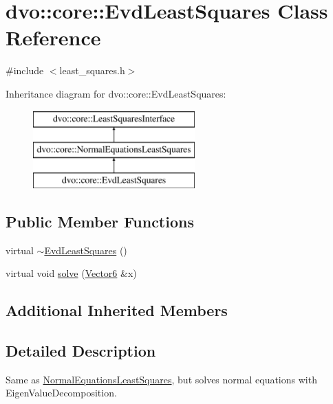 \hypertarget{classdvo_1_1core_1_1_evd_least_squares}{}\section{dvo\+:\+:core\+:\+:Evd\+Least\+Squares Class Reference}
\label{classdvo_1_1core_1_1_evd_least_squares}


{\ttfamily \#include $<$least\+\_\+squares.\+h$>$}

Inheritance diagram for dvo\+:\+:core\+:\+:Evd\+Least\+Squares\+:\begin{figure}[H]
\begin{center}
\leavevmode
\includegraphics[height=3.000000cm]{classdvo_1_1core_1_1_evd_least_squares}
\end{center}
\end{figure}
\subsection*{Public Member Functions}
\begin{DoxyCompactItemize}
\item 
virtual \mbox{\hyperlink{classdvo_1_1core_1_1_evd_least_squares_a560024b449e22ea0da7565b5d798b154}{$\sim$\+Evd\+Least\+Squares}} ()
\item 
virtual void \mbox{\hyperlink{classdvo_1_1core_1_1_evd_least_squares_a7264139b3006d803039707c4318d2451}{solve}} (\mbox{\hyperlink{namespacedvo_1_1core_a05327f3312d32a301bce9fccda9e5807}{Vector6}} \&x)
\end{DoxyCompactItemize}
\subsection*{Additional Inherited Members}


\subsection{Detailed Description}
Same as \mbox{\hyperlink{classdvo_1_1core_1_1_normal_equations_least_squares}{Normal\+Equations\+Least\+Squares}}, but solves normal equations with Eigen\+Value\+Decomposition. 

